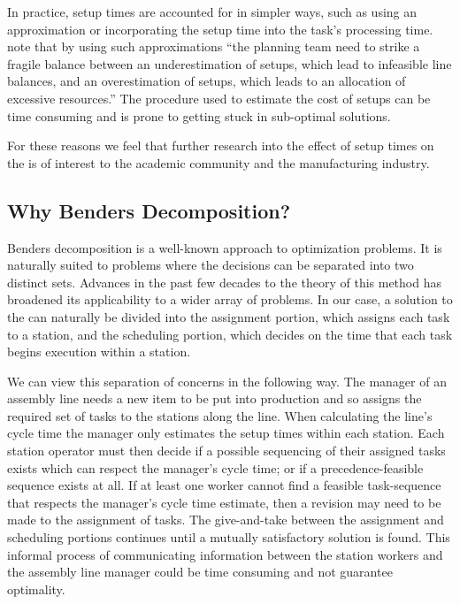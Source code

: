 In practice, setup times are accounted for in simpler ways, such as
using an approximation or incorporating the setup time
into the task's processing time.
\citeauthor{Scholl2013} note that by using such approximations
``the planning team need to strike a fragile balance between an underestimation
of setups, which lead to infeasible line balances, and an overestimation
of setups, which leads to an allocation of excessive resources.''
The procedure used to estimate the cost of setups
can be time consuming and is prone to getting stuck in sub-optimal solutions.

For these reasons we feel that further research into the 
effect of setup times on the \albp{} is of interest to the
academic community and the manufacturing industry.

\subsection{Why Benders Decomposition?}
Benders decomposition is a well-known approach
to optimization problems.
It is naturally suited
to problems where the decisions can be separated into
two distinct sets.
Advances in the past few decades to the theory of
this method has broadened its applicability to a 
wider array of problems.
In our case, a solution to the  can naturally
be divided into the assignment portion, which
assigns each task to a station, and the scheduling
portion, which decides on the time that each task
begins execution within a station.

We can view this separation of concerns in the following
way.
The manager of an assembly line needs a new item
to be put into production and so assigns the required
set of tasks to the stations along the line.
When calculating the line's cycle time the manager only estimates the setup times
within each station.
Each station operator must then decide if a possible sequencing
of their assigned tasks exists which can respect the manager's cycle time;
or if a precedence-feasible sequence exists at all.
If at least one worker cannot find a feasible task-sequence
that respects the manager's cycle time
estimate, then a revision
may need to be made to the assignment of tasks.
The give-and-take between the assignment and scheduling portions
continues until a mutually satisfactory solution is found.
This informal process of communicating information between
the station workers and the assembly line manager could be time
consuming and not guarantee optimality.

